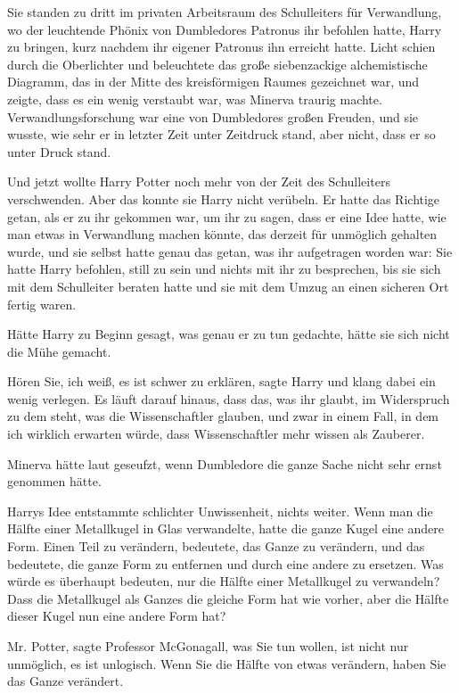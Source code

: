 Sie standen zu dritt im privaten Arbeitsraum des Schulleiters für Verwandlung,
wo der leuchtende Phönix von Dumbledores Patronus ihr befohlen hatte, Harry zu
bringen, kurz nachdem ihr eigener Patronus ihn erreicht hatte. Licht schien
durch die Oberlichter und beleuchtete das große siebenzackige alchemistische
Diagramm, das in der Mitte des kreisförmigen Raumes gezeichnet war, und zeigte,
dass es ein wenig verstaubt war, was Minerva traurig machte.
Verwandlungsforschung war eine von Dumbledores großen Freuden, und sie wusste,
wie sehr er in letzter Zeit unter Zeitdruck stand, aber nicht, dass er so unter
Druck stand.

Und jetzt wollte Harry Potter noch mehr von der Zeit des Schulleiters
verschwenden. Aber das konnte sie Harry nicht verübeln. Er hatte das Richtige
getan, als er zu ihr gekommen war, um ihr zu sagen, dass er eine Idee hatte, wie
man etwas in Verwandlung machen könnte, das derzeit für unmöglich gehalten
wurde, und sie selbst hatte genau das getan, was ihr aufgetragen worden war: Sie
hatte Harry befohlen, still zu sein und nichts mit ihr zu besprechen, bis sie
sich mit dem Schulleiter beraten hatte und sie mit dem Umzug an einen sicheren
Ort fertig waren.

Hätte Harry zu Beginn gesagt, was genau er zu tun gedachte, hätte sie sich nicht
die Mühe gemacht.

\glqq{}Hören Sie, ich weiß, es ist schwer zu erklären\grqq{}, sagte Harry und
klang dabei ein wenig verlegen. \glqq{}Es läuft darauf hinaus, dass das, was ihr
glaubt, im Widerspruch zu dem steht, was die Wissenschaftler glauben, und zwar
in einem Fall, in dem ich wirklich erwarten würde, dass Wissenschaftler mehr
wissen als Zauberer.\grqq{}

Minerva hätte laut geseufzt, wenn Dumbledore die ganze Sache nicht sehr ernst
genommen hätte.

Harrys Idee entstammte schlichter Unwissenheit, nichts weiter. Wenn man die
Hälfte einer Metallkugel in Glas verwandelte, hatte die ganze Kugel eine andere
Form. Einen Teil zu verändern, bedeutete, das Ganze zu verändern, und das
bedeutete, die ganze Form zu entfernen und durch eine andere zu ersetzen. Was
würde es überhaupt bedeuten, nur die Hälfte einer Metallkugel zu verwandeln?
Dass die Metallkugel als Ganzes die gleiche Form hat wie vorher, aber die Hälfte
dieser Kugel nun eine andere Form hat?

\glqq{}Mr. Potter\grqq{}, sagte Professor McGonagall, \glqq{}was Sie tun wollen,
ist nicht nur unmöglich, es ist unlogisch. Wenn Sie die Hälfte von etwas
verändern, haben Sie das Ganze verändert.\grqq{}

